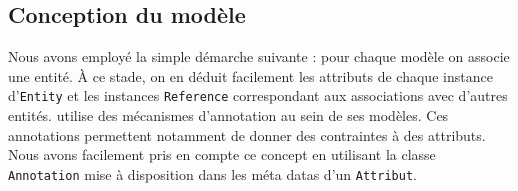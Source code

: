 \subsection{Conception du modèle}
Nous avons employé la simple démarche suivante : pour chaque modèle on associe une entité. À ce stade, on en déduit facilement les attributs de chaque instance d'\verb+Entity+ et les instances \verb+Reference+ correspondant aux associations avec d'autres entités. \kwplay{} utilise des mécanismes d'annotation au sein de ses modèles. Ces annotations permettent notamment de donner des contraintes à des attributs. Nous avons facilement pris en compte ce concept en utilisant la classe \verb+Annotation+ mise à disposition dans les méta datas d'un \verb+Attribut+.
\clearpage


